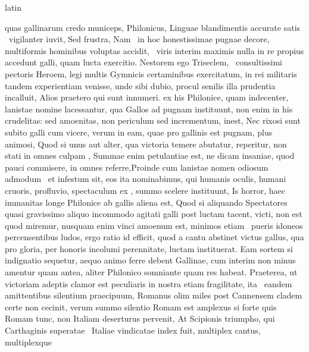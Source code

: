 \documentclass[12pt]{book}
\renewenvironment{latin}
    	{\begin{hyphenrules}{latin}}
    	{\end{hyphenrules}}
\begin{document}
\begin{pages}
\begin{latin}
\begin{Leftside}
                  quas gallinarum credo municeps, Philonicus, Linguae blandimentis accurate satis  \ampersand\ vigilanter iuvit, Sed frustra, Nam  \ampersand\ in hoc honestissimae pugnae decore, 
                  multiformis hominibus voluptas accidit,  \ampersand\ viris interim maximis nulla in re propius accedunt galli, quam lucta exercitio. Nestorem ego Triseclem,  \ampersand\ consultissimi pectoris Heroem, 
                  legi multis Gymnicis certaminibus exercitatum, in rei militaris tandem experientiam venisse, unde sibi dubio, procul senilis illa prudentia incalluit, Alios praetero qui sunt innumeri. 
                   ex his Philonice, quam indecenter, lanistae nomine lacessantur, qua Gallos ad pugnam instituunt, non enim in his crudelitas: 
                  sed amoenitas, non periculum sed incrementum, inest, Nec rixosi sunt subito galli cum vicere, verum in eam, quae pro gallinis  est pugnam, plus animosi,
                  Quod si unus aut alter, qua victoria temere abutatur, reperitur, non stati in omnes culpam , 
                  Summae enim petulantiae est, ne dicam insaniae, quod pauci commisere, in omnes referre,Proinde cum lanistae nomen odiosum admodum  \ampersand\ et infestum sit, eos ita nominabimus, 
                  qui humanis oculis, humani cruoris, profluvio, spectaculum ex , summo scelere instituunt, 
                  Is horror, haec immanitas longe Philonice ab gallis aliena est, Quod si aliquando Spectatores quasi gravissimo aliquo incommodo agitati galli post luctam tacent, victi, non est quod miremur,
                  nusquam enim vinci amoenum est, minimos etiam  \ampersand\ pueris idoneos percensentibus ludos,  ergo  ratio id efficit, 
                  quod a cantu abstinet victus gallus, qua pro gloria, per honoris incolumi perennitate, luctam instituerat. Eam sortem si indignatio sequetur, aequo animo ferre debent Gallinae, 
                  cum interim non minus amentur quam antea, aliter Philonico somniante quam res habeat. Praeterea, ut victoriam adeptis clamor est peculiaris in nostra etiam fragilitate, 
                  ita  \ampersand\ eandem amittentibus silentium praecipuum, Romanus olim miles post Cannensem cladem certe non cecinit, verum summo silentio Romam est amplexus si forte quis Romam
                  tunc, non Italiam deserturus pervenit, At Scipionis triumpho, qui Carthaginis superatae  \ampersand\ Italiae vindicatae index fuit, multiplex cantus, multiplexque

\end{Leftside}
\end{latin}
\end{pages}
\end{document}

